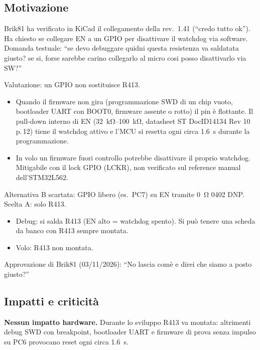 \subsection{Motivazione}
Brik81 ha verificato in KiCad il collegamento della rev.\ 1.41 (\textquotedblleft{}credo tutto ok\textquotedblright{}). Ha chiesto se collegare EN a un GPIO per disattivare il watchdog via software. Domanda testuale: \textquotedblleft{}se devo debuggare quidni questa resistenza va saldatata giusto? se si, forse sarebbe carino collegarlo al micro cosi posso disattivarlo via SW?\textquotedblright{}

Valutazione: un GPIO non sostituisce R413.
\begin{itemize}
\item Quando il firmware non gira (programmazione SWD di un chip vuoto, bootloader UART con BOOT0, firmware assente o rotto) il pin \`e flottante. Il pull-down interno di EN (\SIrange{32}{100}{\kilo\ohm}, datasheet ST DocID14134 Rev 10 p.\,12) tiene il watchdog attivo e l'MCU si resetta ogni circa \SI{1,6}{\second} durante la programmazione.
\item In volo un firmware fuori controllo potrebbe disattivare il proprio watchdog. Mitigabile con il lock GPIO (LCKR), non verificato sul reference manual dell'STM32L562.
\end{itemize}

Alternativa B scartata: GPIO libero (es.\ PC7) su EN tramite \SI{0}{\ohm} 0402 DNP. Scelta A: solo R413.
\begin{itemize}
\item Debug: si salda R413 (EN alto = watchdog spento). Si pu\`o tenere una scheda da banco con R413 sempre montata.
\item Volo: R413 non montata.
\end{itemize}

Approvazione di Brik81 (03/11/2026): \textquotedblleft{}No lascia comè e direi che siamo a posto giusto?\textquotedblright{}

\subsection{Impatti e criticit\`a}
\begin{notebox}
\textbf{Nessun impatto hardware.} Durante lo sviluppo R413 va montata: altrimenti debug SWD con breakpoint, bootloader UART e firmware di prova senza impulso su PC6 provocano reset ogni circa \SI{1,6}{\second}.
\end{notebox}

